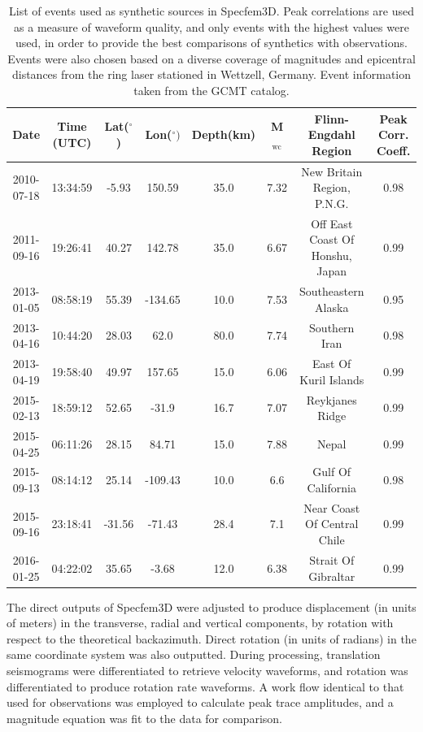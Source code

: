 \documentclass{gji}
\begin{document}
\begin{table}
\begin{minipage}{150mm}
	\begin{center}
		\begin{tabular}{ |c|c|c|c|c|c|c|c| } 
		\bf{Date} & \bf{Time (UTC)} & \bf{Lat($^\circ$)} & \bf{Lon($^\circ)$} & \bf{Depth(km)} & \bf{M$_{\text{wc}}$} &\bf{Flinn-Engdahl Region} &\bf{Peak Corr. Coeff.}\\ \hline
	2010-07-18 & 13:34:59 & -5.93 & 150.59 & 35.0 & 7.32 & New Britain Region, P.N.G. & 0.98\\
	2011-09-16 & 19:26:41 & 40.27 & 142.78 & 35.0 & 6.67 & Off East Coast Of Honshu, Japan & 0.99\\
	2013-01-05 & 08:58:19 & 55.39 & -134.65 & 10.0 & 7.53 & Southeastern Alaska & 0.95\\
	2013-04-16 & 10:44:20 & 28.03 & 62.0 & 80.0 & 7.74 & Southern Iran & 0.98\\
	2013-04-19 & 19:58:40 & 49.97 & 157.65 & 15.0 & 6.06 & East Of Kuril Islands & 0.99\\
	2015-02-13 & 18:59:12 & 52.65 & -31.9 & 16.7 & 7.07 & Reykjanes Ridge & 0.99\\
	2015-04-25 & 06:11:26 & 28.15 & 84.71 & 15.0 & 7.88 & Nepal & 0.99\\
	2015-09-13 & 08:14:12 & 25.14 & -109.43 & 10.0 & 6.6 & Gulf Of California & 0.98\\
	2015-09-16 & 23:18:41 & -31.56 & -71.43 & 28.4 & 7.1 & Near Coast Of Central Chile & 0.99\\
	2016-01-25 & 04:22:02 & 35.65 & -3.68 & 12.0 & 6.38 & Strait Of Gibraltar & 0.99\\
		\end{tabular}
    		\caption{List of events used as synthetic sources in Specfem3D. Peak correlations are used as a measure of waveform quality, and only events with the highest values were used, in order to provide the best comparisons of synthetics with observations. Events were also chosen based on a diverse coverage of magnitudes and epicentral distances from the ring laser stationed in Wettzell, Germany. Event information taken from the GCMT catalog.}
		\label{tab:syn_events}
	\end{center}
	\end{minipage}
\end{table}

The direct outputs of Specfem3D were adjusted to produce displacement (in units of meters) in the transverse, radial and vertical components, by rotation with respect to the theoretical backazimuth. Direct rotation (in units of radians) in the same coordinate system was also outputted. During processing, translation seismograms were differentiated to retrieve velocity waveforms, and rotation was differentiated to produce rotation rate waveforms. A work flow identical to that used for observations was employed to calculate peak trace amplitudes, and a magnitude equation was fit to the data for comparison.
\end{document}
